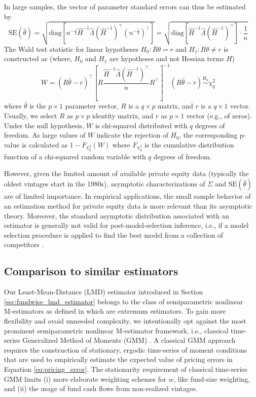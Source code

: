 \documentclass[12pt]{article}
\begin{document}
In large samples, the vector of parameter standard errors can thus be estimated by
\[
\mathrm{SE}(\hat{\theta}) = 
\sqrt{
	\mathrm{diag} \left[
	n^{-\frac{1}{2}}
	\hat{H}^{-1} \hat{\Lambda} (\hat{H}^{-1})^\top
	(n^{-\frac{1}{2}})^\top
	\right] 
}
=
\sqrt{
	\mathrm{diag} \left[
	\hat{H}^{-1} \hat{\Lambda} (\hat{H}^{-1})^\top
	\right] 
	\cdot \frac{1}{n}
}
\]
The Wald test statistic for linear hypotheses $H_0: R \theta = r$ and $H_1: R \theta \neq r$ is constructed as (where, $H_0$ and $H_1$ are hypotheses and not Hessian terms $H$)
\[
W = 
(R \hat{\theta} - r)^\top
\left[
R
\frac{\hat{H}^{-1} \hat{\Lambda} (\hat{H}^{-1})^\top}{n}
R^\top
\right]^{-1}
(R \hat{\theta} - r)
\stackrel{H_0}{\sim}
\chi_q^2
\]
where $\hat{\theta}$ is the $p \times 1$ parameter vector, $R$ is a $q \times p$ matrix, and $r$ is a $q \times 1$ vector.
Usually, we select $R$ as $p \times p$ identity matrix, and $r$ as $p \times 1$ vector (e.g., of zeros).
Under the null hypothesis, $W$ is chi-squared distributed with $q$ degrees of freedom. As large values of $W$ indicate the rejection of $H_0$, the corresponding p-value is calculated as $1 - F_{\chi_q^2}(W)$ where $F_{\chi_q^2}$ is the cumulative distribution function of a chi-squared random variable with $q$ degrees of freedom.


However, given the limited amount of available private equity data (typically the oldest vintages start in the 1980s), asymptotic characterizations of ${\Sigma}$ and $\mathrm{SE}(\hat{\theta})$ are of limited importance. 
In empirical applications, the small sample behavior of an estimation method for private equity data is more relevant than its asymptotic theory.
Moreover, the standard asymptotic distribution associated with an estimator is generally not valid for post-model-selection inference, i.e., if a model selection procedure is applied to find the best model from a collection of competitors \citep{LP05}.


\subsection{Comparison to similar estimators}
\label{sec:comparison_to_similar_estimators}

Our Least-Mean-Distance (LMD) estimator introduced in Section \ref{sec:fundwise_lmd_estimator} belongs to the class of semiparametric nonlinear M-estimators as defined in \cite{PP97} which are extremum estimators.
To gain more flexibility and avoid unneeded complexity, we intentionally opt against the most prominent semiparametric nonlinear M-estimator framework, i.e., classical time-series Generalized Method of Moments (GMM) \citep{H82,H12}.
A classical GMM approach requires the construction of stationary, ergodic time-series of moment conditions that are used to empirically estimate the expected value of pricing errors in Equation \ref{eq:pricing_error}.
The stationarity requirement of classical time-series GMM limits (i) more elaborate weighting schemes for $w$, like fund-size weighting, and (ii) the usage of fund cash flows from non-realized vintages.
\end{document}
